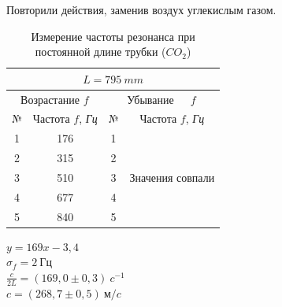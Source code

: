 \documentclass[12pt]{article}
\begin{document}
	Повторили действия, заменив воздух углекислым газом.
	
	\noindent
	\begin{table}[h]
		\begin{center}
		\begin{tabular}{|c|c|c|c|}
			\hline
			\multicolumn{4}{|c|}{$L = 795\ mm$} \\
			\hline
			\multicolumn{2}{|c|}{Возрастание $f$} & \multicolumn{2}{|c|}{Убывание\ \ \    $f$}\\
			\hline
			№ & Частота $f$, \textit{Гц} & № & Частота $f$, \textit{Гц} \\
			\hline
			1& 176&1 &\multirow{5}{*}{Значения совпали}\\
			\cline{1-3}
			2& 315&2 &\\
			\cline{1-3}
			3& 510&3 &\\
			\cline{1-3}
			4& 677&4 &\\
			\cline{1-3}
			5& 840&5 &\\
			\hline
		\end{tabular}
		\caption{Измерение частоты резонанса при постоянной длине трубки ($CO_2$)}
	\end{center}
		\end{table}
		
	 \begin{minipage}{0.6\textwidth}
	 \centering{}
	\end{minipage}
	\vspace{0.05\textwidth}
	\begin{minipage}{0.25\textwidth}
		\centering
		$y = 169 x - 3,4$\\
		$\sigma_f = 2\ \textit{Гц}$\\
		$\frac{c}{2L} = (169,0 \pm 0,3)\  c^{-1}$\\
		$ c = (268,7 \pm 0,5)\ \textit{м/c}$\\
		
		
	\end{minipage}
	
\end{document}
